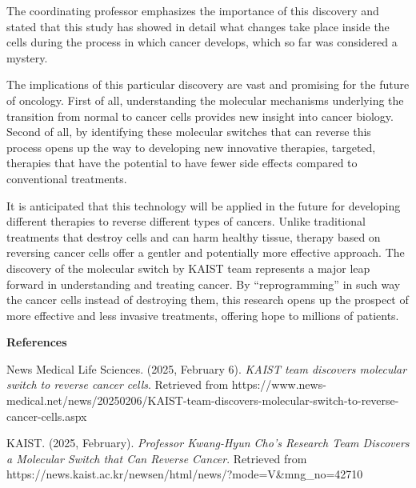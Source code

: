 \documentclass[12pt,a4paper]{article}
\begin{document}
	The coordinating professor emphasizes the importance of this discovery and stated that this study has showed in detail what changes take place inside the cells during the process in which cancer develops, which so far was considered a mystery. 
	
	The implications of this particular discovery are vast and promising for the future of oncology. First of all, understanding the molecular mechanisms underlying the transition from normal to cancer cells provides new insight into cancer biology. Second of all, by identifying these molecular switches that can reverse this process opens up the way to developing new innovative therapies, targeted, therapies that have the potential to have fewer side effects compared to conventional treatments. 
	
	It is anticipated that this technology will be applied in the future for developing different therapies to reverse different types of cancers. Unlike traditional treatments that destroy cells and can harm healthy tissue, therapy based on reversing cancer cells offer a gentler and potentially more effective approach. The discovery of the molecular switch by KAIST team represents a major leap forward in understanding and treating cancer. By ``reprogramming'' in such way the cancer cells instead of destroying them, this research opens up the prospect of more effective and less invasive treatments, offering hope to millions of patients.
	
\vspace{2cm}
\begin{center}
	\textbf{References}
\end{center}

\begin{thebibliography}{9}
	
	News Medical Life Sciences. (2025, February 6). 
	\textit{KAIST team discovers molecular switch to reverse cancer cells}. 
	Retrieved from https://www.news-medical.net/news/20250206/KAIST-team-discovers-molecular-switch-to-reverse-cancer-cells.aspx
	
	KAIST. (2025, February). 
	\textit{Professor Kwang-Hyun Cho's Research Team Discovers a Molecular Switch that Can Reverse Cancer}. 
	Retrieved from https://news.kaist.ac.kr/newsen/html/news/?mode=V\&mng\_no=42710
	
\end{thebibliography}
\end{document}
